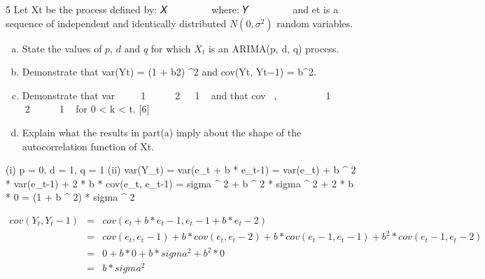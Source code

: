 \documentclass[a4paper,12pt]{article}
\begin{document}


5 Let Xt be the process defined by:
𝑋􀯧 􀵌 􀷍𝑌 􀯜
􀯧
􀯜􀭀􀬵
where:
𝑌􀯧 􀵌 𝑒􀯧 􀵅 𝑏𝑒􀯧􀬿􀬵
and et is a sequence of independent and identically distributed $N(0, \sigma^2)$ random
variables.
\begin{enumerate}[(a)]
\item State the values of $p$, $d$ and $q$ for which $X_t$ is an ARIMA(p, d, q) process. 
\item Demonstrate that var(Yt) = (1 + b2) \sigma^2 and cov(Yt, Yt−1) = b\sigma^2. 
\item Demonstrate that
var􁈺𝑋􀯧􁈻 􀵌 𝑡􁈺1 􀵅 𝑏􀬶􁈻\sigma􀬶 􀵅 2􁈺𝑡 􀵆 1􁈻𝑏\sigma􀬶
and that
cov􁈺𝑋􀯧, 𝑋􀯧􀬿􀯞􁈻 􀵌 􁈺𝑡 􀵆 𝑘􁈻􁈺1 􀵅 𝑏􀬶􁈻\sigma􀬶 􀵅 􁈺2􁈺𝑡 􀵆 𝑘􁈻 􀵆 1􁈻𝑏\sigma􀬶
for 0 < k < t. [6]
\item Explain what the results in part(a) imply about the shape of the
autocorrelation function of Xt. 
\end{enumerate}

\newpage

(i)
p = 0, d = 1, q = 1 
(ii)
var(Y_t) = var(e_t + b * e_t-1)
= var(e_t) + b ^ 2 * var(e_t-1) + 2 * b * cov(e_t, e_t-1) 
= sigma ^ 2 + b ^ 2 * sigma ^ 2 + 2 * b * 0 
= (1 + b ^ 2) * sigma ^ 2 

\begin{eqnarray*}
cov(Y_t, Y_t-1) &=& cov(e_t + b * e_t-1, e_t-1 + b * e_t-2)\\
&=&  cov(e_t, e_t-1) + b * cov(e_t, e_t-2) + b * cov(e_t-1, e_t-1) + b ^ 2 * cov(e_t-1, e_t-2) \\
&=&  0 + b * 0 + b * sigma ^ 2 + b ^ 2 * 0 \\
&=&  b * sigma ^ 2 \\
\end{eqnarray*}
\end{document}
